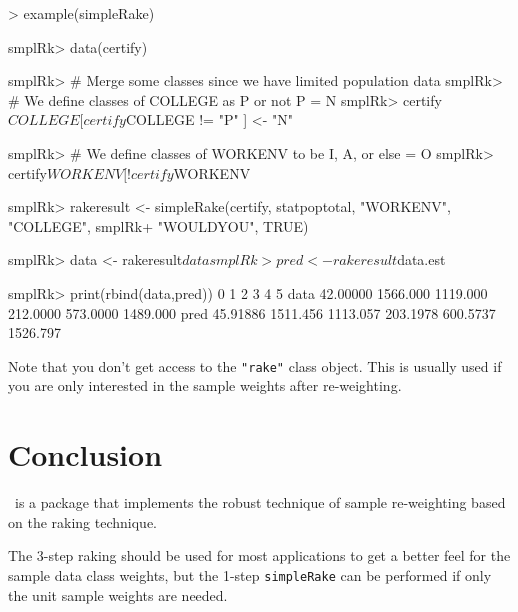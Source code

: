 \documentclass[12pt]{TDH-article}
\begin{document}
\begin{Schunk}
\begin{Sinput}
> example(simpleRake)
\end{Sinput}
\begin{Soutput}
smplRk> data(certify)

smplRk> # Merge some classes since we have limited population data
smplRk> # We define classes of COLLEGE as P or not P = N
smplRk> certify$COLLEGE[   certify$COLLEGE  !=    "P"      ] <- "N"

smplRk> # We define classes of WORKENV to be I, A, or else = O
smplRk> certify$WORKENV[ ! certify$WORKENV %in% c("I","A") ] <- "O"

smplRk> rakeresult <- simpleRake(certify, statpoptotal, "WORKENV", "COLLEGE",
smplRk+ "WOULDYOU", TRUE)

smplRk> data <- rakeresult$data

smplRk> pred <- rakeresult$data.est

smplRk> print(rbind(data,pred))
            0        1        2        3        4        5
data 42.00000 1566.000 1119.000 212.0000 573.0000 1489.000
pred 45.91886 1511.456 1113.057 203.1978 600.5737 1526.797
\end{Soutput}
\end{Schunk}

Note that you don't get access to the {\tt "rake"} class object. This is usually used if you are only interested in the sample weights after re-weighting.

\section{Conclusion}
\rake\ is a package that implements the robust technique of sample re-weighting based on the raking technique.

The 3-step raking should be used for most applications to get a better feel for the sample data class weights, but the 1-step {\tt simpleRake} can be performed if only the unit sample weights are needed.

\appendix


\end{document}
